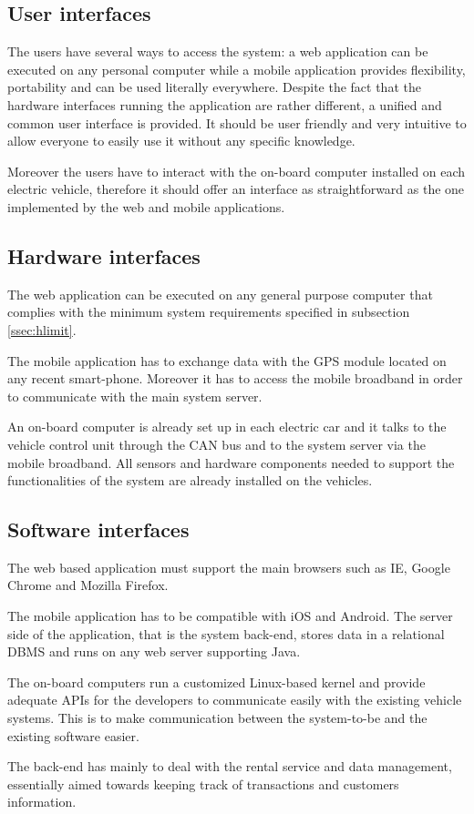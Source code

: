 \subsection{User interfaces}
The users have several ways to access the system: a web application can be executed on any personal computer while a mobile application provides flexibility, portability and can be used literally everywhere. Despite the fact that the hardware interfaces running the application are rather different, a unified and common user interface is provided. It should be user friendly and very intuitive to allow everyone to easily use it without any specific knowledge.

Moreover the users have to interact with the on-board computer installed on each electric vehicle, therefore it should offer an interface as straightforward as the one implemented by the web and mobile applications.

\subsection{Hardware interfaces} \label{hw_int}
The web application can be executed on any general purpose computer that complies with the minimum system requirements specified in subsection \ref{ssec:hlimit}.

The mobile application has to exchange data with the GPS module located on any recent smart-phone. Moreover it has to access the mobile broadband in order to communicate with the main system server.

An on-board computer is already set up in each electric car and it talks to the vehicle control unit through the CAN bus and to the system server via the mobile broadband. All sensors and hardware components needed to support the functionalities of the system are already installed on the vehicles.

\subsection{Software interfaces}
The web based application must support the main browsers such as IE, Google Chrome and Mozilla Firefox.

The mobile application has to be compatible with iOS and Android. The server side of the application, that is the system back-end, stores data in a relational DBMS and runs on any web server supporting Java.

The on-board computers run a customized Linux-based kernel and provide adequate APIs for the developers to communicate easily with the existing vehicle systems. This is to make communication between the system-to-be and the existing software easier.

The back-end has mainly to deal with the rental service and data management, essentially aimed towards keeping track of transactions and customers information.
